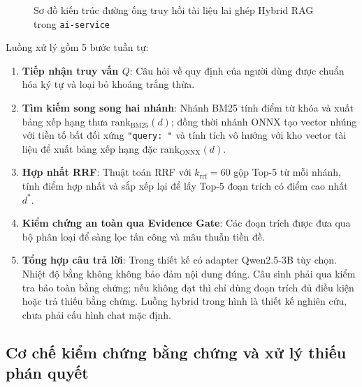 \begin{figure}[!htbp]
{%
}
\vspace{0.1cm}
\caption{Sơ đồ kiến trúc đường ống truy hồi tài liệu lai ghép Hybrid RAG trong \texttt{ai-service}}
\label{fig:hybrid_rag_pipeline}
\end{figure}

Luồng xử lý gồm 5 bước tuần tự:
\begin{enumerate}[nosep]
  \item \textbf{Tiếp nhận truy vấn $Q$}: Câu hỏi về quy định của người dùng được chuẩn hóa ký tự và loại bỏ khoảng trắng thừa.
  \item \textbf{Tìm kiếm song song hai nhánh}: Nhánh BM25 tính điểm từ khóa và xuất bảng xếp hạng thưa $\text{rank}_{\text{BM25}}(d)$; đồng thời nhánh ONNX tạo vector nhúng với tiền tố bất đối xứng \texttt{"query: "} và tính tích vô hướng với kho vector tài liệu để xuất bảng xếp hạng đặc $\text{rank}_{\text{ONNX}}(d)$.
  \item \textbf{Hợp nhất RRF}: Thuật toán RRF với $k_{\text{rrf}} = 60$ gộp Top-5 từ mỗi nhánh, tính điểm hợp nhất và sắp xếp lại để lấy Top-5 đoạn trích có điểm cao nhất $d^*$.
  \item \textbf{Kiểm chứng an toàn qua Evidence Gate}: Các đoạn trích được đưa qua bộ phân loại để sàng lọc tấn công và mâu thuẫn tiền đề.
  \item \textbf{Tổng hợp câu trả lời}: Trong thiết kế có adapter Qwen2.5-3B tùy chọn. Nhiệt độ bằng không không bảo đảm nội dung đúng. Câu sinh phải qua kiểm tra bảo toàn bằng chứng; nếu không đạt thì chỉ dùng đoạn trích đủ điều kiện hoặc trả thiếu bằng chứng. Luồng hybrid trong hình là thiết kế nghiên cứu, chưa phải cấu hình chat mặc định.
\end{enumerate}

\subsection{Cơ chế kiểm chứng bằng chứng và xử lý thiếu phán quyết}

